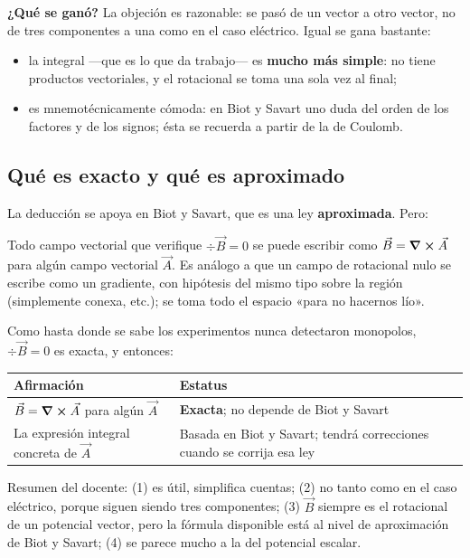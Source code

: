 \documentclass[12pt,a4paper]{article}
\begin{document}
\textbf{¿Qué se ganó?} La objeción es razonable: se pasó de un vector a otro vector,
no de tres componentes a una como en el caso eléctrico. Igual se gana bastante:

\begin{itemize}
  \item la integral ---que es lo que da trabajo--- es \textbf{mucho más simple}: no tiene
  productos vectoriales, y el rotacional se toma una sola vez al final;
  \item es mnemotécnicamente cómoda: en Biot y Savart uno duda del orden de los
  factores y de los signos; ésta se recuerda a partir de la de Coulomb.
\end{itemize}

\subsection{Qué es exacto y qué es aproximado}

La deducción se apoya en Biot y Savart, que es una ley \textbf{aproximada}. Pero:

\begin{notebox}
Todo campo vectorial que
verifique $\div \vec B = 0$ se puede escribir como
$\vec B = \curl \vec A$ para algún campo vectorial $\vec A$. Es análogo
a que un campo de rotacional nulo se escribe como un gradiente, con hipótesis
del mismo tipo sobre la región (simplemente conexa, etc.); se toma todo el
espacio «para no hacernos lío».
\end{notebox}

Como hasta donde se sabe los experimentos nunca detectaron monopolos,
$\div \vec B = 0$ es exacta, y entonces:

\begin{center}
\renewcommand{\arraystretch}{1.35}
\small
\begin{tabularx}{\textwidth}{>{\raggedright\arraybackslash}X>{\raggedright\arraybackslash}X}
\toprule
\textbf{Afirmación} & \textbf{Estatus} \\
\midrule
$\vec B = \curl \vec A$ para algún $\vec A$ & \textbf{Exacta}; no depende de Biot y Savart \\
La expresión integral concreta de $\vec A$ & Basada en Biot y Savart; tendrá correcciones cuando se corrija esa ley \\
\bottomrule
\end{tabularx}
\end{center}

Resumen del docente: (1) es útil, simplifica cuentas; (2) no tanto como en el
caso eléctrico, porque siguen siendo tres componentes; (3) $\vec B$ siempre es
el rotacional de un potencial vector, pero la fórmula disponible está al nivel
de aproximación de Biot y Savart; (4) se parece mucho a la del potencial
escalar.
\end{document}
